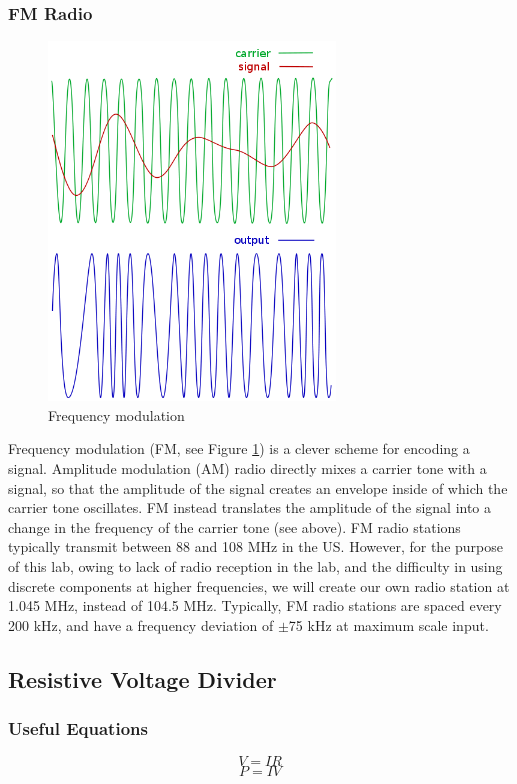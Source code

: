 \documentclass[11pt]{article}
\begin{document}
\subsubsection*{FM Radio}

\begin{figure}[h]
\centering
\includegraphics[width=3in]{plots/frequency_modulation.png}
\caption{Frequency modulation}\label{fig:frequency_modulation}
\end{figure}

Frequency modulation (FM, see Figure \ref{fig:frequency_modulation}) is a clever scheme for 
encoding a signal.  Amplitude modulation (AM) radio
directly mixes a carrier tone with a signal, so that the amplitude of the signal creates an envelope inside
of which the carrier tone oscillates.  FM instead translates the amplitude of the signal into a change
in the frequency of the carrier tone (see above).  FM radio stations typically transmit between 88 and 108 MHz
in the US.  However, for the purpose of this lab, owing to lack of radio reception in the lab, and the
difficulty in using discrete components at higher frequencies, we will create our own radio station at
1.045 MHz, instead of 104.5 MHz.  Typically, FM radio stations are spaced every 200 kHz, and have a frequency
deviation of $\pm$75 kHz at maximum scale input.

\subsection{Resistive Voltage Divider}

\subsubsection{Useful Equations}
\begin{equation}
V=IR
\end{equation}
\begin{equation}
P=IV
\end{equation}
\end{document}

